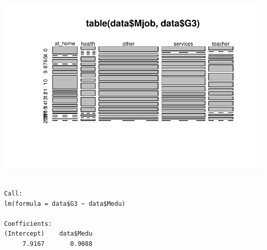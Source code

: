 \documentclass[
  letterpaper,
  DIV=11,
  numbers=noendperiod]{scrartcl}
\newenvironment{Shaded}{\begin{snugshade}}{\end{snugshade}}
\newcommand{\FunctionTok}[1]{\textcolor[rgb]{0.28,0.35,0.67}{#1}}
\newcommand{\NormalTok}[1]{\textcolor[rgb]{0.00,0.23,0.31}{#1}}
\newcommand{\SpecialCharTok}[1]{\textcolor[rgb]{0.37,0.37,0.37}{#1}}
\begin{document}
\begin{Shaded}
\end{Shaded}

\includegraphics{education_files/figure-pdf/unnamed-chunk-3-1.pdf}

\begin{Shaded}
\end{Shaded}

\begin{verbatim}

Call:
lm(formula = data$G3 ~ data$Medu)

Coefficients:
(Intercept)    data$Medu  
     7.9167       0.9088  
\end{verbatim}
\end{document}
